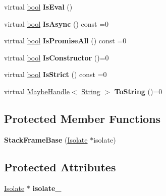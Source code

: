\begin{DoxyCompactItemize}
virtual \mbox{\hyperlink{classbool}{bool}} {\bfseries Is\+Eval} ()
\item 
\mbox{\label{classv8_1_1internal_1_1StackFrameBase_a61906b75a1912f500daa7273bc82eb53}} 
virtual \mbox{\hyperlink{classbool}{bool}} {\bfseries Is\+Async} () const =0
\item 
\mbox{\label{classv8_1_1internal_1_1StackFrameBase_a159ae54b9f6836a66442f302e6db7197}} 
virtual \mbox{\hyperlink{classbool}{bool}} {\bfseries Is\+Promise\+All} () const =0
\item 
\mbox{\label{classv8_1_1internal_1_1StackFrameBase_ae51dd957cf0f55af5d109167a106388c}} 
virtual \mbox{\hyperlink{classbool}{bool}} {\bfseries Is\+Constructor} ()=0
\item 
\mbox{\label{classv8_1_1internal_1_1StackFrameBase_a93afc4a161c2880cf3ef50d24b33abc8}} 
virtual \mbox{\hyperlink{classbool}{bool}} {\bfseries Is\+Strict} () const =0
\item 
\mbox{\label{classv8_1_1internal_1_1StackFrameBase_a2d94711024e8a6ea9b4979bc1ce3e6da}} 
virtual \mbox{\hyperlink{classv8_1_1internal_1_1MaybeHandle}{Maybe\+Handle}}$<$ \mbox{\hyperlink{classv8_1_1internal_1_1String}{String}} $>$ {\bfseries To\+String} ()=0
\end{DoxyCompactItemize}
\subsection*{Protected Member Functions}
\begin{DoxyCompactItemize}
\item 
\mbox{\label{classv8_1_1internal_1_1StackFrameBase_ae7f120727af35ff4f6eb5376061b3838}} 
{\bfseries Stack\+Frame\+Base} (\mbox{\hyperlink{classv8_1_1internal_1_1Isolate}{Isolate}} $\ast$isolate)
\end{DoxyCompactItemize}
\subsection*{Protected Attributes}
\begin{DoxyCompactItemize}
\item 
\mbox{\label{classv8_1_1internal_1_1StackFrameBase_a8d4a0e2ad842c9c8f1c4ed93adc9f7d1}} 
\mbox{\hyperlink{classv8_1_1internal_1_1Isolate}{Isolate}} $\ast$ {\bfseries isolate\+\_\+}
\end{DoxyCompactItemize}


